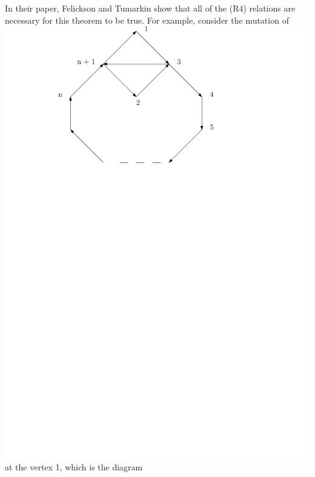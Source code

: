 \documentclass{beamer}
\begin{document}
\begin{frame}
In their paper, Felickson and Tumarkin show that all of the (R4) relations are necessary for this theorem to be true. For example, consider the mutation of \includegraphics[scale = .30]{Diagram2.pdf} at the vertex 1, which is the diagram
\begin{figure}

\end{figure}
\end{frame}
\end{document}

